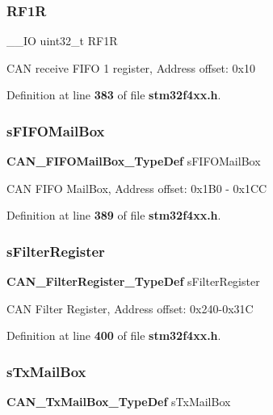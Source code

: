 \subsubsection{R\+F1R}
{\footnotesize\ttfamily \+\_\+\+\_\+\+IO uint32\+\_\+t R\+F1R}

C\+AN receive F\+I\+FO 1 register, Address offset\+: 0x10 

Definition at line \textbf{ 383} of file \textbf{ stm32f4xx.\+h}.

\mbox{\label{structCAN__TypeDef_afdef128e1ffe70acd7033674f7980967}} 
\subsubsection{s\+F\+I\+F\+O\+Mail\+Box}
{\footnotesize\ttfamily \textbf{ C\+A\+N\+\_\+\+F\+I\+F\+O\+Mail\+Box\+\_\+\+Type\+Def} s\+F\+I\+F\+O\+Mail\+Box}

C\+AN F\+I\+FO Mail\+Box, Address offset\+: 0x1\+B0 -\/ 0x1\+CC 

Definition at line \textbf{ 389} of file \textbf{ stm32f4xx.\+h}.

\mbox{\label{structCAN__TypeDef_aef658b2e9c6484d0c0f6202d627277fd}} 
\subsubsection{s\+Filter\+Register}
{\footnotesize\ttfamily \textbf{ C\+A\+N\+\_\+\+Filter\+Register\+\_\+\+Type\+Def} s\+Filter\+Register}

C\+AN Filter Register, Address offset\+: 0x240-\/0x31C 

Definition at line \textbf{ 400} of file \textbf{ stm32f4xx.\+h}.

\mbox{\label{structCAN__TypeDef_af9bdf5d33749953f3c815e6c8dc84ec0}} 
\subsubsection{s\+Tx\+Mail\+Box}
{\footnotesize\ttfamily \textbf{ C\+A\+N\+\_\+\+Tx\+Mail\+Box\+\_\+\+Type\+Def} s\+Tx\+Mail\+Box}

